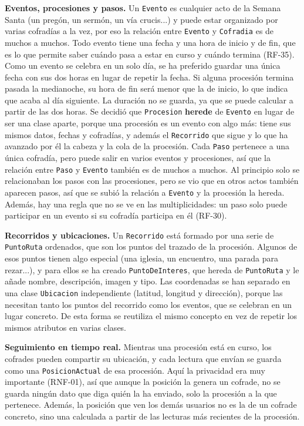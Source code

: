 \textbf{Eventos, procesiones y pasos.} Un \texttt{Evento} es cualquier acto de la Semana Santa (un pregón, un sermón, un vía crucis...) y puede estar organizado por varias cofradías a la vez, por eso la relación entre \texttt{Evento} y \texttt{Cofradia} es de muchos a muchos. Todo evento tiene una fecha y una hora de inicio y de fin, que es lo que permite saber cuándo pasa a estar en curso y cuándo termina (RF-35). Como un evento se celebra en un solo día, se ha preferido guardar una única fecha con sus dos horas en lugar de repetir la fecha. Si alguna procesión termina pasada la medianoche, su hora de fin será menor que la de inicio, lo que indica que acaba al día siguiente. La duración no se guarda, ya que se puede calcular a partir de las dos horas. Se decidió que \texttt{Procesion} \textbf{herede} de \texttt{Evento} en lugar de ser una clase aparte, porque una procesión es un evento con algo más: tiene sus mismos datos, fechas y cofradías, y además el \texttt{Recorrido} que sigue y lo que ha avanzado por él la cabeza y la cola de la procesión. Cada \texttt{Paso} pertenece a una única cofradía, pero puede salir en varios eventos y procesiones, así que la relación entre \texttt{Paso} y \texttt{Evento} también es de muchos a muchos. Al principio solo se relacionaban los pasos con las procesiones, pero se vio que en otros actos también aparecen pasos, así que se subió la relación a \texttt{Evento} y la procesión la hereda. Además, hay una regla que no se ve en las multiplicidades: un paso solo puede participar en un evento si su cofradía participa en él (RF-30).

\textbf{Recorridos y ubicaciones.} Un \texttt{Recorrido} está formado por una serie de \texttt{PuntoRuta} ordenados, que son los puntos del trazado de la procesión. Algunos de esos puntos tienen algo especial (una iglesia, un encuentro, una parada para rezar...), y para ellos se ha creado \texttt{PuntoDeInteres}, que hereda de \texttt{PuntoRuta} y le añade nombre, descripción, imagen y tipo. Las coordenadas se han separado en una clase \texttt{Ubicacion} independiente (latitud, longitud y dirección), porque las necesitan tanto los puntos del recorrido como los eventos, que se celebran en un lugar concreto. De esta forma se reutiliza el mismo concepto en vez de repetir los mismos atributos en varias clases.

\textbf{Seguimiento en tiempo real.} Mientras una procesión está en curso, los cofrades pueden compartir su ubicación, y cada lectura que envían se guarda como una \texttt{PosicionActual} de esa procesión. Aquí la privacidad era muy importante (RNF-01), así que aunque la posición la genera un cofrade, no se guarda ningún dato que diga quién la ha enviado, solo la procesión a la que pertenece. Además, la posición que ven los demás usuarios no es la de un cofrade concreto, sino una calculada a partir de las lecturas más recientes de la procesión.

